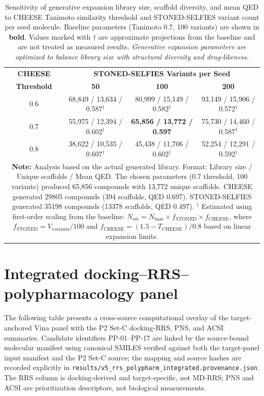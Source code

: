 \documentclass[journal=jcisd8,manuscript=suppinfo]{achemso}
\begin{document}
\begin{table}[!htbp]
\centering
\caption{Sensitivity of generative expansion library size, scaffold diversity, and mean QED to CHEESE Tanimoto similarity threshold and STONED-SELFIES variant count per seed molecule. Baseline parameters (Tanimoto \num{0.7}, \num{100} variants) are shown in \textbf{bold}. Values marked with $\dagger$ are approximate projections from the baseline and are not treated as measured results. \textit{Generative expansion parameters are optimized to balance library size with structural diversity and drug-likeness.}}
\label{tab:sm_s18_expansion_sensitivity}
\small
\begin{tabular}{@{}c c c c@{}}
\toprule
\textbf{CHEESE} & \multicolumn{3}{c}{\textbf{STONED-SELFIES Variants per Seed}} \\
\textbf{Threshold} & \textbf{50} & \textbf{100} & \textbf{200} \\
\midrule
0.6 & 68,849 / 13,634 / 0.587$^\dagger$ & 80,999 / 15,149 / 0.582$^\dagger$ & 93,149 / 15,906 / 0.572$^\dagger$ \\
0.7 & 55,975 / 12,394 / 0.602$^\dagger$ & \textbf{65,856 / 13,772 / 0.597} & 75,730 / 14,460 / 0.587$^\dagger$ \\
0.8 & 38,622 / 10,535 / 0.607$^\dagger$ & 45,438 / 11,706 / 0.602$^\dagger$ & 52,254 / 12,291 / 0.592$^\dagger$ \\
\bottomrule
\multicolumn{4}{p{16cm}}{
\noindent\textbf{Note:} Analysis based on the actual generated library. Format: Library size / Unique scaffolds / Mean QED.
The chosen parameters (0.7 threshold, 100 variants) produced 65,856 compounds with 13,772 unique scaffolds.
CHEESE generated \num{29805} compounds (\num{394} scaffolds, QED \num{0.697}).
STONED-SELFIES generated \num{35198} compounds (\num{13378} scaffolds, QED \num{0.497}).
$^\dagger$ Estimated using first-order scaling from the baseline: $N_{\text{est}} = N_{\text{base}} \times f_{\text{STONED}} \times f_{\text{CHEESE}}$, where $f_{\text{STONED}} = V_{\text{variants}}/100$ and $f_{\text{CHEESE}} = (1.5 - T_{\text{CHEESE}})/0.8$ based on linear expansion limits.
}
\end{tabular}
\end{table}

\section*{Integrated docking--RRS--polypharmacology panel}
\label{sec:sm_integrated_panel}

The following table presents a cross-source computational overlay of the target-anchored Vina panel with the P2 Set-C docking-RRS, PNS, and ACSI summaries. Candidate identifiers PP-01--PP-17 are linked by the source-bound molecular manifest using canonical SMILES verified against both the target-panel input manifest and the P2 Set-C source; the mapping and source hashes are recorded explicitly in \texttt{results/v5\_rrs\_polypharm\_integrated.provenance.json}. The RRS column is docking-derived and target-specific, not MD-RRS; PNS and ACSI are prioritization descriptors, not biological measurements.
\end{document}
